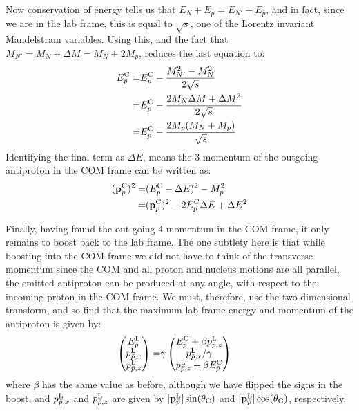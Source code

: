 Now conservation of energy tells us that $E_N+E_p=E_{N'}+E_{\bar{p}}$, and in fact, since we are in the lab frame, this is equal to $\sqrt{s}$, one of the Lorentz invariant Mandelstram variables.
Using this, and the fact that $M_{N'}=M_N+\Delta{}M=M_N+2M_p$, reduces the last equation to:
\begin{align}
E^{\textrm{C}}_{\bar{p}}=&
E^{\textrm{C}}_{p}-
\frac{M_{N'}^2-M_N^2}{2\sqrt{s}}\\
=& E^{\textrm{C}}_{p}-
\frac{2M_{N}\Delta{}M+\Delta{}M^2}{2\sqrt{s}}\\
=& E^{\textrm{C}}_{p}-
\frac{2M_{p}(M_N+M_p)}{\sqrt{s}}
\end{align}
Identifying the final term as $\Delta{}E$, means the 3-momentum of the outgoing antiproton in the \ac{COM} frame can be written as:
\begin{align}
(\mathbf{p}^{\textrm{C}}_{\bar{p}})^2 
=& (E_p^{\textrm{C}}-\Delta{}E)^2-M_p^2\\
=& (\mathbf{p}^{\textrm{C}}_{p})^2-2E_p^{\textrm{C}}\Delta{}E+\Delta{}E^2
\end{align}

Finally, having found the out-going 4-momentum in the \ac{COM} frame, it only remains to boost back to the lab frame.
The one subtlety here is that while boosting into the \ac{COM} frame we did not have to think of the transverse momentum since the \ac{COM} and all proton and nucleus motions are all parallel,
the emitted antiproton can be produced at any angle, with respect to the incoming proton in the \ac{COM} frame.
We must, therefore, use the two-dimensional transform, and so find that the maximum lab frame energy and momentum of the antiproton  is given by:
\begin{align}
\begin{pmatrix}
E^{\textrm{L}}_{\bar{p}}\\
p^{\textrm{L}}_{\bar{p},x}\\
p^{\textrm{L}}_{\bar{p},z}
\end{pmatrix}
=&\gamma
\begin{pmatrix}
E^{\textrm{C}}_{\bar{p}}+\beta{}p^{\textrm{L}}_{\bar{p},z}\\
p^{\textrm{L}}_{\bar{p},x}/\gamma{}\\
p^{\textrm{L}}_{\bar{p},z}+\beta{}E^{\textrm{C}}_{\bar{p}}
\end{pmatrix}
\end{align}
where $\beta$ has the same value as before, although we have flipped the signs in the boost, and $p^{\textrm{L}}_{\bar{p},x}$  and $p^{\textrm{L}}_{\bar{p},z}$  are given by $|\mathbf{p}^{\textrm{L}}_{\bar{p}}|\sin(\theta_{\textrm{C}})$  and $|\mathbf{p}^{\textrm{L}}_{\bar{p}}|\cos(\theta_{\textrm{C}})$, respectively.

